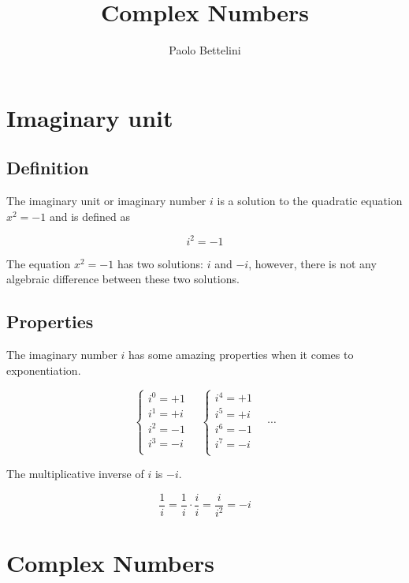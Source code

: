 \documentclass{article}
\title{Complex Numbers}
\author{Paolo Bettelini}
\date{}
\begin{document}
\maketitle
\tableofcontents
\pagebreak

\section{Imaginary unit}

\subsection{Definition}

The imaginary unit or imaginary number \(i\) is a solution to the quadratic
equation \(x^2=-1\) and is defined as

\[
    i^2 = -1
\]

The equation \(x^2 = -1\) has two solutions: \(i\) and \(-i\), however,
there is not any algebraic difference between these two solutions.

\subsection{Properties}

The imaginary number \(i\) has some amazing properties when it comes to exponentiation.

\[
	\begin{cases}
		i^0=+1\\
		i^1=+i\\
		i^2=-1\\
		i^3=-i\\
	\end{cases}
	\quad
	\begin{cases}
		i^4=+1\\
		i^5=+i\\
		i^6=-1\\
		i^7=-i\\
	\end{cases}
	\quad
	\cdots
\]

The multiplicative inverse of \(i\) is \(-i\).

\[
    \frac{1}{i} = \frac{1}{i} \cdot \frac{i}{i}
    = \frac{i}{i^2} = -i
\]

\pagebreak

\section{Complex Numbers}
\end{document}

